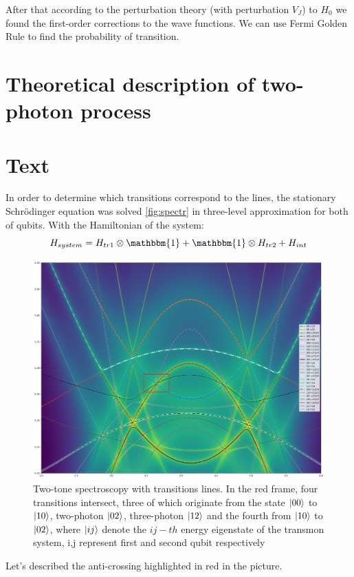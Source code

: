 \documentclass[%
 aip,
 amsmath,amssymb,
 reprint,%
]{revtex4-1}
\begin{document}
After that according to the perturbation theory (with perturbation $V_J$) to $H_0$ we found the first-order corrections to the wave functions. We can use Fermi Golden Rule to find the probability of transition.
\appendix
\section{Theoretical description of two-photon process}





\section{Text}


In order to determine which transitions correspond to the lines, the stationary Schrödinger equation was solved \autoref{fig:spectr} in three-level approximation for both of qubits. With the Hamiltonian of the system:
\begin{equation}
	H_{system} = H_{tr1}\otimes\mathbbm{1}+\mathbbm{1}\otimes H_{tr2}+H_{int}
\end{equation}
\begin{figure}[h]
	\centering
	\includegraphics[width=\linewidth]{spectr}
	\caption{Two-tone spectroscopy with transitions lines. In the red frame, four transitions intersect, three of which originate from the state $\ket{00}$ to $\ket{10}$, two-photon
		$\ket{02}$, three-photon
		$\ket{12}$ and the fourth from  $\ket{10}$ to  $\ket{02}$, where $\ket{ij}$ denote the $ij-th$ energy eigenstate of the transmon system, i,j represent first and second qubit respectively}
	\label{fig:spectr}
\end{figure}


 Let's described the anti-crossing highlighted in red in the picture. 
 
 

\end{document}
